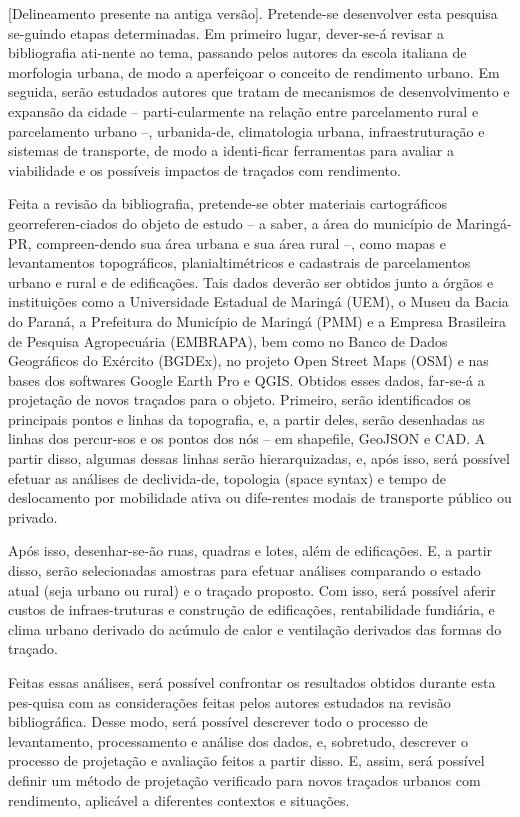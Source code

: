 \documentclass[twoside, 12pt, english,italian,latin,greek,french,spanish,brazil]{book}
\begin{document}
        [Delineamento presente na antiga versão]. Pretende-se desenvolver esta pesquisa se-guindo etapas determinadas. Em primeiro lugar, dever-se-á revisar a bibliografia ati-nente ao tema, passando pelos autores da escola italiana de morfologia urbana, de modo a aperfeiçoar o conceito de rendimento urbano. Em seguida, serão estudados autores que tratam de mecanismos de desenvolvimento e expansão da cidade – parti-cularmente na relação entre parcelamento rural e parcelamento urbano –, urbanida-de, climatologia urbana, infraestruturação e sistemas de transporte, de modo a identi-ficar ferramentas para avaliar a viabilidade e os possíveis impactos de traçados com rendimento.

        Feita a revisão da bibliografia, pretende-se obter materiais cartográficos georreferen-ciados do objeto de estudo – a saber, a área do município de Maringá-PR, compreen-dendo sua área urbana e sua área rural –, como mapas e levantamentos topográficos, planialtimétricos e cadastrais de parcelamentos urbano e rural e de edificações. Tais dados deverão ser obtidos junto a órgãos e instituições como a Universidade Estadual de Maringá (UEM), o Museu da Bacia do Paraná, a Prefeitura do Município de Maringá (PMM) e a Empresa Brasileira de Pesquisa Agropecuária (EMBRAPA), bem como no Banco de Dados Geográficos do Exército (BGDEx), no projeto Open Street Maps (OSM) e nas bases dos softwares Google Earth Pro e QGIS. Obtidos esses dados, far-se-á a projetação de novos traçados para o objeto. Primeiro, serão identificados os principais pontos e linhas da topografia, e, a partir deles, serão desenhadas as linhas dos percur-sos e os pontos dos nós – em shapefile, GeoJSON e CAD. A partir disso, algumas dessas linhas serão hierarquizadas, e, após isso, será possível efetuar as análises de declivida-de, topologia (space syntax) e tempo de deslocamento por mobilidade ativa ou dife-rentes modais de transporte público ou privado. 

        Após isso, desenhar-se-ão ruas, quadras e lotes, além de edificações. E, a partir disso, serão selecionadas amostras para efetuar análises comparando o estado atual (seja urbano ou rural) e o traçado proposto. Com isso, será possível aferir custos de infraes-truturas e construção de edificações, rentabilidade fundiária, e clima urbano derivado do acúmulo de calor e ventilação derivados das formas do traçado.

        Feitas essas análises, será possível confrontar os resultados obtidos durante esta pes-quisa com as considerações feitas pelos autores estudados na revisão bibliográfica. Desse modo, será possível descrever todo o processo de levantamento, processamento e análise dos dados, e, sobretudo, descrever o processo de projetação e avaliação feitos a partir disso. E, assim, será possível definir um método de projetação verificado para novos traçados urbanos com rendimento, aplicável a diferentes contextos e situações.
\end{document}

